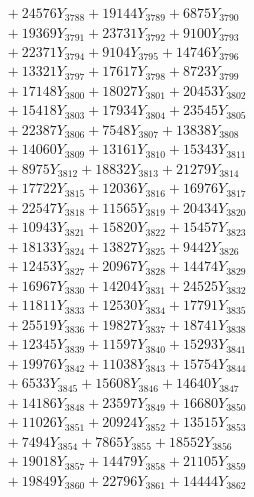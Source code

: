 \documentclass[a4paper,10pt]{article}
\begin{document}
{\begin{align}
&\;  + 24576 Y_{3788} + 19144 Y_{3789} + 6875 Y_{3790} \\[0.3ex]
&\;  + 19369 Y_{3791} + 23731 Y_{3792} + 9100 Y_{3793} \\[0.3ex]
&\;  + 22371 Y_{3794} + 9104 Y_{3795} + 14746 Y_{3796} \\[0.3ex]
&\;  + 13321 Y_{3797} + 17617 Y_{3798} + 8723 Y_{3799} \\[0.3ex]
&\;  + 17148 Y_{3800} + 18027 Y_{3801} + 20453 Y_{3802} \\[0.3ex]
&\;  + 15418 Y_{3803} + 17934 Y_{3804} + 23545 Y_{3805} \\[0.3ex]
&\;  + 22387 Y_{3806} + 7548 Y_{3807} + 13838 Y_{3808} \\[0.5ex]\allowbreak
&\;  + 14060 Y_{3809} + 13161 Y_{3810} + 15343 Y_{3811} \\[0.3ex]
&\;  + 8975 Y_{3812} + 18832 Y_{3813} + 21279 Y_{3814} \\[0.3ex]
&\;  + 17722 Y_{3815} + 12036 Y_{3816} + 16976 Y_{3817} \\[0.3ex]
&\;  + 22547 Y_{3818} + 11565 Y_{3819} + 20434 Y_{3820} \\[0.3ex]
&\;  + 10943 Y_{3821} + 15820 Y_{3822} + 15457 Y_{3823} \\[0.3ex]
&\;  + 18133 Y_{3824} + 13827 Y_{3825} + 9442 Y_{3826} \\[0.3ex]
&\;  + 12453 Y_{3827} + 20967 Y_{3828} + 14474 Y_{3829} \\[0.3ex]
&\;  + 16967 Y_{3830} + 14204 Y_{3831} + 24525 Y_{3832} \\[0.3ex]
&\;  + 11811 Y_{3833} + 12530 Y_{3834} + 17791 Y_{3835} \\[0.3ex]
&\;  + 25519 Y_{3836} + 19827 Y_{3837} + 18741 Y_{3838} \\[0.5ex]\allowbreak
&\;  + 12345 Y_{3839} + 11597 Y_{3840} + 15293 Y_{3841} \\[0.3ex]
&\;  + 19976 Y_{3842} + 11038 Y_{3843} + 15754 Y_{3844} \\[0.3ex]
&\;  + 6533 Y_{3845} + 15608 Y_{3846} + 14640 Y_{3847} \\[0.3ex]
&\;  + 14186 Y_{3848} + 23597 Y_{3849} + 16680 Y_{3850} \\[0.3ex]
&\;  + 11026 Y_{3851} + 20924 Y_{3852} + 13515 Y_{3853} \\[0.3ex]
&\;  + 7494 Y_{3854} + 7865 Y_{3855} + 18552 Y_{3856} \\[0.3ex]
&\;  + 19018 Y_{3857} + 14479 Y_{3858} + 21105 Y_{3859} \\[0.3ex]
&\;  + 19849 Y_{3860} + 22796 Y_{3861} + 14444 Y_{3862} \\[0.3ex]

\end{align}}
\end{document}

